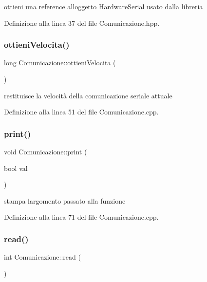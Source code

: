 ottieni una reference all\textquotesingle{}oggetto Hardware\+Serial usato dalla libreria 



Definizione alla linea 37 del file Comunicazione.\+hpp.

\mbox{\label{class_comunicazione_a6fd31edb993b9909e0aa176e9f270e92}} 
\subsubsection{\texorpdfstring{ottieni\+Velocita()}{ottieniVelocita()}}
{\footnotesize\ttfamily long Comunicazione\+::ottieni\+Velocita (\begin{DoxyParamCaption}{ }\end{DoxyParamCaption})}



restituisce la velocità della comunicazione seriale attuale 



Definizione alla linea 51 del file Comunicazione.\+cpp.

\mbox{\label{class_comunicazione_ab6c02b2d02cf67af2b090b1a960cad7d}} 
\subsubsection{\texorpdfstring{print()}{print()}}
{\footnotesize\ttfamily void Comunicazione\+::print (\begin{DoxyParamCaption}\item[{bool}]{val }\end{DoxyParamCaption})}



stampa l\textquotesingle{}argomento passato alla funzione 



Definizione alla linea 71 del file Comunicazione.\+cpp.

\mbox{\label{class_comunicazione_a0901013668cd1ec2eac99f6127856f85}} 
\subsubsection{\texorpdfstring{read()}{read()}}
{\footnotesize\ttfamily int Comunicazione\+::read (\begin{DoxyParamCaption}{ }\end{DoxyParamCaption})}



